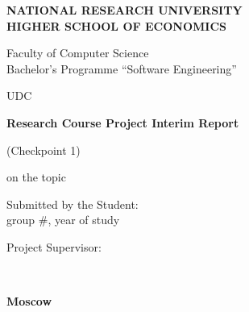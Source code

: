 %
\begin{titlepage}
\thispagestyle{empty}
\singlespacing
\footnotesize
\setlength{\parindent}{0pt}
\setlength{\parskip}{0pt}


\begin{center}
\textbf{NATIONAL RESEARCH UNIVERSITY}\\
\textbf{HIGHER SCHOOL OF ECONOMICS}

\vspace{0.35cm}
Faculty of Computer Science\\
Bachelor's Programme ``Software Engineering''
\end{center}

\vspace{0.3cm}
\noindent
UDC~\hseUDC

\vspace{1.6cm}
\begin{center}
\textbf{\normalsize Research Course Project Interim Report}

\vspace{0.12cm}
(Checkpoint 1)

\vspace{0.45cm}
on the topic
\underline{\makebox[0.9\textwidth][c]{\hseProjectName}}
\end{center}

\vspace{1.4cm}
\noindent
\begin{minipage}[t]{0.5\textwidth}
\raggedright
Submitted by the Student:\\
group \#\hseGroup, \hseCourse{} year of study

\vspace{0.25cm}
\strut\hseAuthorName
\end{minipage}

\vspace{0.9cm}
\noindent
\begin{minipage}[t]{0.7\textwidth}
\raggedright
Project Supervisor:\\
\strut\hseSupervisorName\\
\strut\hseSupervisorTitle
\end{minipage}

\vfill
\begin{center}
\textbf{Moscow \hseYear}
\end{center}

\end{titlepage}

\setcounter{page}{2}
\clearpage
